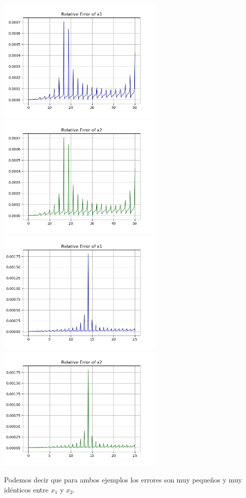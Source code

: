 \documentclass[12pt]{article}
\begin{document}
\begin{center}
    \includegraphics[height=6cm]{G2_1d.png}\hspace*{\fill}
    \includegraphics[height=6cm]{G2_1e.png}\\
    \includegraphics[height=6cm]{G2_2c.png}\hspace*{\fill}
    \includegraphics[height=6cm]{G2_2d.png}\\
\end{center}
Podemos decir que para ambos ejemplos los errores son muy pequeños y muy idénticos entre $x_1$ y $x_2$. 
\end{document}
